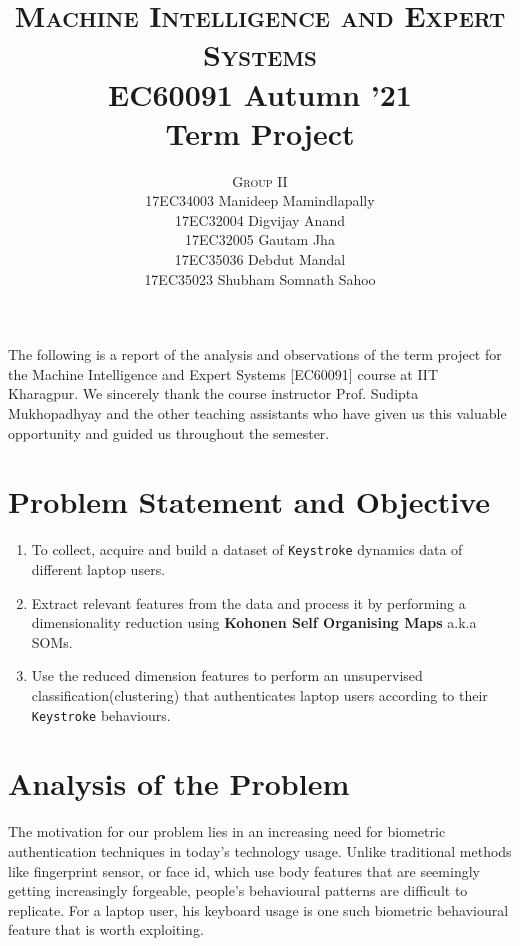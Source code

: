 \documentclass[a4paper,10pt]{article}
\begin{document}
%
   \title{{ 
   \textsc{Machine Intelligence and Expert Systems}\\ EC60091 Autumn '21 \\ Term Project } \\}

   \author{ 
   	{\textsc{Group II}}\\
   	17EC34003	Manideep Mamindlapally \\
   	17EC32004	Digvijay Anand \\
   	17EC32005	Gautam Jha \\
   	17EC35036	Debdut Mandal \\
   	17EC35023	Shubham Somnath Sahoo}
          
   \date{}
   \maketitle

\noindent The following is a report of the analysis and observations of the term project for the Machine Intelligence and Expert Systems [EC60091] course at IIT Kharagpur. We sincerely thank the course instructor Prof. Sudipta Mukhopadhyay and the other teaching assistants who have given us this valuable opportunity and guided us throughout the semester.

\section{Problem Statement and Objective}
\begin{enumerate}
	\item To collect, acquire and build a dataset of \texttt{Keystroke} dynamics data of different laptop users.
	\item Extract relevant features from the data and process it by performing a dimensionality reduction using \textbf{Kohonen Self Organising Maps} a.k.a SOMs.
	\item Use the reduced dimension features to perform an unsupervised classification(clustering) that authenticates laptop users according to their \texttt{Keystroke} behaviours.
\end{enumerate}

\section{Analysis of the Problem}

The motivation for our problem lies in an increasing need for biometric authentication techniques in today's technology usage. Unlike traditional methods like fingerprint sensor, or face id, which use body features that are seemingly getting increasingly forgeable, people's behavioural patterns are difficult to replicate. For a laptop user, his keyboard usage is one such biometric behavioural feature that is worth exploiting.
\\
\end{document}
